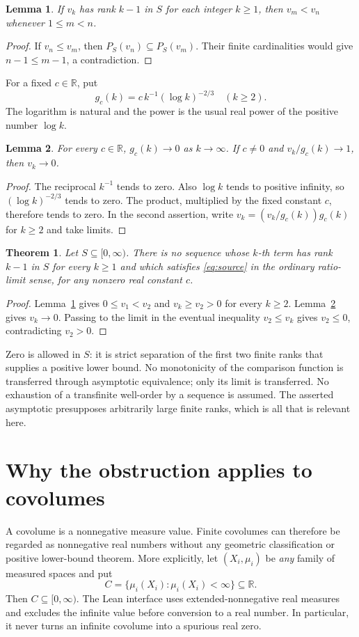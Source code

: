 \documentclass[11pt]{article}
\newtheorem{theorem}{Theorem}
\newtheorem{lemma}{Lemma}
\newcommand{\R}{\mathbb R}
\begin{document}
\begin{lemma}\label{lem:rank}
If $v_k$ has rank $k-1$ in $S$ for each integer $k\geq1$, then
$v_m<v_n$ whenever $1\leq m<n$.
\end{lemma}
\begin{proof}
If $v_n\leq v_m$, then $P_S(v_n)\subseteq P_S(v_m)$.
Their finite cardinalities would give $n-1\leq m-1$, a contradiction.
\end{proof}

For a fixed $c\in\R$, put
\[
 g_c(k)=c\,k^{-1}(\log k)^{-2/3}\quad(k\geq2).
\]
The logarithm is natural and the power is the usual real power of the
positive number $\log k$.
\begin{lemma}\label{lem:limit}
For every $c\in\R$, $g_c(k)\longrightarrow0$ as $k\longrightarrow\infty$.
If $c\ne0$ and $v_k/g_c(k)\longrightarrow1$, then $v_k\longrightarrow0$.
\end{lemma}
\begin{proof}
The reciprocal $k^{-1}$ tends to zero. Also $\log k$ tends to positive
infinity, so $(\log k)^{-2/3}$ tends to zero. The product, multiplied by
the fixed constant $c$, therefore tends to zero. In the second assertion,
write $v_k=(v_k/g_c(k))g_c(k)$ for $k\geq2$ and take limits.
\end{proof}

\begin{theorem}\label{thm:main}
Let $S\subseteq[0,\infty)$. There is no sequence whose $k$-th term has
rank $k-1$ in $S$ for every $k\geq1$ and which satisfies
\eqref{eq:source} in the ordinary ratio-limit sense, for any nonzero
real constant $c$.
\end{theorem}
\begin{proof}
Lemma~\ref{lem:rank} gives $0\leq v_1<v_2$ and $v_k\geq v_2>0$
for every $k\geq2$. Lemma~\ref{lem:limit} gives $v_k\to0$.
Passing to the limit in the eventual inequality $v_2\leq v_k$ gives
$v_2\leq0$, contradicting $v_2>0$.
\end{proof}

Zero is allowed in $S$: it is strict separation of the first two finite
ranks that supplies a positive lower bound. No monotonicity of the
comparison function is transferred through asymptotic equivalence; only
its limit is transferred. No exhaustion of a transfinite well-order by a
sequence is assumed. The asserted asymptotic presupposes arbitrarily
large finite ranks, which is all that is relevant here.

\section{Why the obstruction applies to covolumes}
A covolume is a nonnegative measure value. Finite covolumes can therefore
be regarded as nonnegative real numbers without any geometric
classification or positive lower-bound theorem. More explicitly, let
$(X_i,\mu_i)$ be \emph{any} family of measured spaces and put
\[
 C=\{\mu_i(X_i):\mu_i(X_i)<\infty\}\subseteq\R.
\]
Then $C\subseteq[0,\infty)$. The Lean interface uses extended-nonnegative
real measures and excludes the infinite value before conversion to a
real number. In particular, it never turns an infinite covolume into a
spurious real zero.
\end{document}
